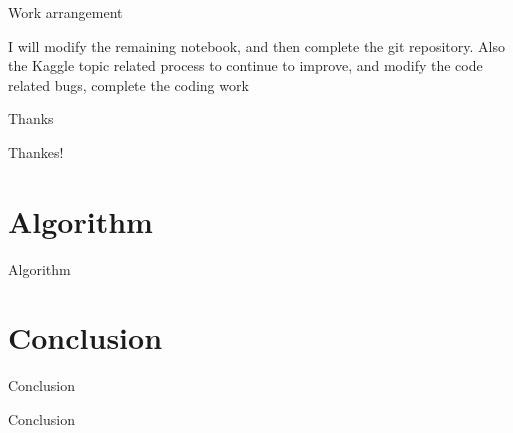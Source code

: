 \documentclass[
 size=14pt,
 paper=smartboard,  %
 mode=present, 		%
 display=slides, 	%
 style=tuliplab,  	%
 pauseslide,
 fleqn,leqno]{powerdot}
\begin{document}
\begin{slide}{Work arrangement}

I will modify the remaining notebook, and then complete the git repository.
Also the Kaggle topic related process to continue to improve, and modify the code related bugs, complete the coding work


\end{slide}

\begin{slide}{Thanks}

Thankes!

\end{slide}

\section{Algorithm}
\begin{slide}[toc=,bm=]{Algorithm}

\end{slide}

\section{Conclusion}
\begin{slide}[toc=,bm=]{Conclusion}

\end{slide}

\begin{slide}[toc=,bm=]{Conclusion}



\end{slide}
\end{document}
